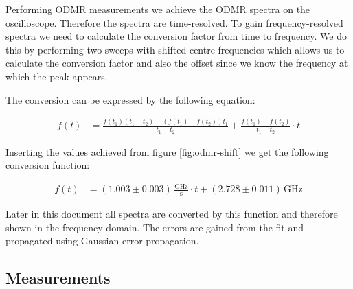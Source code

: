 Performing ODMR measurements we achieve the ODMR spectra on the oscilloscope. Therefore the spectra are time-resolved. To gain frequency-resolved spectra we need to calculate the conversion factor from time to frequency. We do this by performing two sweeps with shifted centre frequencies which allows us to calculate the conversion factor and also the offset since we know the frequency at which the peak appears.

The conversion can be expressed by the following equation:

\begin{align}
f(t)&=\frac{f(t_1)(t_1-t_2)-(f(t_1)-f(t_2))t_1}{t_1-t_2}+\frac{f(t_1)-f(t_2)}{t_1-t_2}\cdot t
\end{align}

Inserting the values achieved from figure \ref{fig:odmr-shift} we get the following conversion function:

\begin{align}
f(t)&=(1.003\pm0.003)\,\mathrm{\frac{GHz}{s}}\cdot t+(2.728\pm0.011)\,\mathrm{GHz}
\end{align}

Later in this document all spectra are converted by this function and therefore shown in the frequency domain. The errors are gained from the fit and propagated using Gaussian error propagation.

\subsection{Measurements}